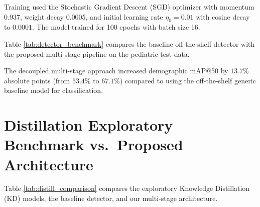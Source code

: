 Training used the Stochastic Gradient Descent (SGD) optimizer with momentum 0.937, weight decay 0.0005, and initial learning rate $\eta_0 = 0.01$ with cosine decay to $0.0001$. The model trained for 100 epochs with batch size 16.

Table \ref{tab:detector_benchmark} compares the baseline off-the-shelf detector with the proposed multi-stage pipeline on the pediatric test data.

\begin{table}[htbp]
\centering
\caption{Detection Performance Comparison of Base YOLO26s vs.\ Proposed Multi-Stage Pipeline}
\label{tab:detector_benchmark}
\end{table}

The decoupled multi-stage approach increased demographic mAP@50 by $13.7\%$ absolute points (from $53.4\%$ to $67.1\%$) compared to using the off-the-shelf generic baseline model for classification.

\section{Distillation Exploratory Benchmark vs.\ Proposed Architecture}\label{sec:distill_bench}
Table \ref{tab:distill_comparison} compares the exploratory Knowledge Distillation (KD) models, the baseline detector, and our multi-stage architecture.

